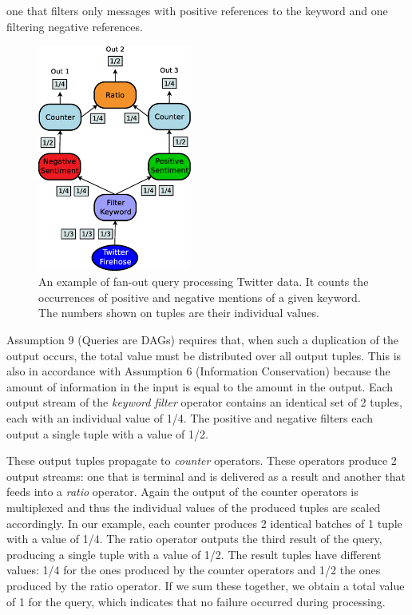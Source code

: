 one that filters only messages with positive references to the keyword and one filtering negative
references.
\clearpage
\begin{figure}[b!]
	\centering
	\includegraphics[width=0.45\textwidth]{img/tesi/fan-out_2} 
	\caption{An example of fan-out query processing Twitter data. It counts the occurrences of positive and
	negative mentions of a given keyword. The numbers shown on tuples are their individual \sic values.}
	\label{fig:query_fanout}
\end{figure}

Assumption 9 (Queries are DAGs) requires that, when such a duplication of the
output occurs, the total \sic value must be distributed over all output tuples. This is also in
accordance with Assumption 6 (Information Conservation) because the amount of information in the input is
equal to the amount in the output.
Each output stream of the \emph{keyword filter} operator contains an identical set of 2
tuples, each with an individual \sic value of 1/4.
The positive and negative filters each output a single tuple with a \sic value of 1/2. 

These output tuples propagate to \emph{counter} operators. These operators produce 2 output
streams: one that is terminal and is delivered as a result and another that feeds into a \emph{ratio}
operator.
Again the output of the counter operators is multiplexed and thus the individual \sic values of
the produced tuples are scaled accordingly. In our example, each counter produces 2 identical batches of
1 tuple with a \sic value of 1/4. The ratio operator outputs the third result of the query, producing a
single tuple with a \sic value of 1/2.
The result tuples have different \sic values: 1/4 for the
ones produced by the counter operators and 1/2 the ones produced by the ratio operator. If we sum
these together, we obtain a total \sic value of 1 for the query, which indicates that
no failure occurred during processing. 


